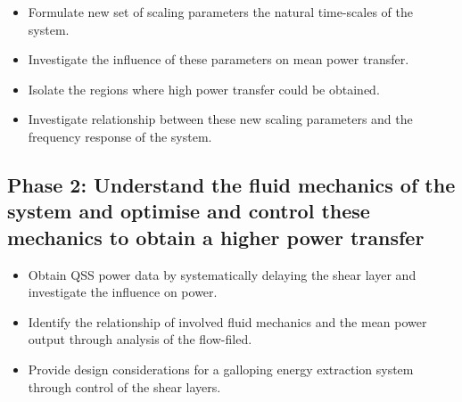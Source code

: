  \begin{itemize}
\item Formulate new set of scaling parameters the natural time-scales of the system.
\item Investigate the influence of these parameters on mean power transfer.
\item Isolate the regions where high power transfer could be obtained.
\item Investigate relationship between these new scaling parameters and the frequency response of the system. 
 \end{itemize}
 
    
  \subsection*{Phase 2: Understand the fluid mechanics of the system and optimise and control these mechanics to obtain a higher power transfer}
  
    


  \begin{itemize}
  	\item Obtain QSS power data by systematically delaying the shear layer and investigate the influence on power.
  	\item Identify the relationship of involved fluid mechanics and the mean power output through analysis of the flow-filed.
  	\item Provide design considerations for a galloping energy extraction system through control of the shear layers. 
  \end{itemize}
 
 
 
 
 
 
 























  


    

     










